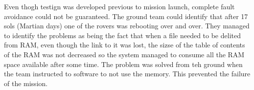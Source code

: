 Even thogh testign was developed previous to mission launch, complete fault
avoidance could not be guaranteed. The ground team could identify that after 17
sols (Martian days) one of the rovers was rebooting over and over. They managed
to identify the problems as being the fact that when a file needed to be delited
from RAM, even though the link to it was lost, the sizse of the table of
contents of the RAM was not decreased so the system managed to consume all the
RAM space available after some time. The problem was solved from teh ground when
the team instructed to software to not use the memory. This prevented the
failure of the mission.

